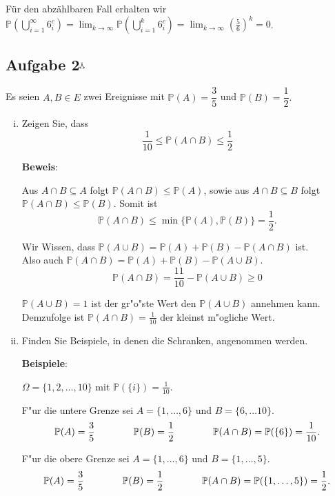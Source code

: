 \documentclass[11pt,a4paper,ngerman]{article}
\newcommand{\set}[1]{ \{ #1 \}}
\newcommand{\Prob}{\mathbb{P}}
\newcommand{\maxw}{$^\curlywedgedownarrow$}
\begin{document}
Für den abzählbaren Fall erhalten wir \\
$\Prob(\bigcup_{i=1}^\infty 6_i^c) = \lim_{k\to \infty} \Prob(\bigcup_{i=1}^k 6_i^c)
= \lim_{k\to \infty} \left(\frac{5}{6}\right)^k = 0$.

\subsection*{Aufgabe 2\maxw} 
Es seien $A, B \in E$ zwei Ereignisse mit $\Prob(A) = \dfrac{3}{5}$ und
$\Prob(B) = \dfrac{1}{2}.$

\begin{enumerate}[(i)]
  \item Zeigen Sie, dass \[
      \dfrac{1}{10} \le \Prob(A \cap B) \le \dfrac{1}{2}
    \]

    \textbf{Beweis}:

    Aus $A \cap B \subseteq A$ folgt $\Prob(A \cap B) \le \Prob(A)$, sowie aus
    $A \cap B \subseteq B$ folgt $\Prob(A \cap B) \le \Prob(B)$. Somit ist \[
      \Prob(A \cap B) \le \min\set{\Prob(A), \Prob(B)} = \dfrac{1}{2}.
    \]

    Wir Wissen, dass $\Prob(A\cup B) = \Prob(A) + \Prob(B) - \Prob(A\cap B)$ ist.\\
    Also auch $\Prob(A\cap B) = \Prob(A) + \Prob(B) - \Prob(A\cup B)$.
    \[
      \Prob(A\cap B) = \dfrac{11}{10} - \Prob(A\cup B) \ge 0
    \]

    $\Prob(A\cup B) = 1$ ist der gr"o"ste Wert den $\Prob(A\cup B)$ annehmen
    kann. Demzufolge ist $\Prob(A\cap B) = \frac{1}{10}$ der kleinst m"ogliche
    Wert.

  \item Finden Sie Beispiele, in denen die Schranken, angenommen werden.

    \textbf{Beispiele}:

    $\Omega = \set{1,2,\ldots,10}$ mit $\Prob(\set i) = \frac{1}{10}$.

    F"ur die untere Grenze sei $A = \set{1,\ldots,6}$ und
    $B = \set{6, \ldots 10}$. \[
      \Prob(A) = \dfrac{3}{5} \\ \qquad\qquad
      \Prob(B) = \dfrac{1}{2} \\ \qquad\qquad
      \Prob(A\cap B) = \Prob(\set 6) = \dfrac{1}{10}.
    \]

    F"ur die obere Grenze sei $A = \set{1,\ldots,6}$ und
    $B = \set{1,\ldots, 5}$. \[
      \Prob(A) = \dfrac{3}{5} \\ \qquad\qquad
      \Prob(B) = \dfrac{1}{2} \\ \qquad\qquad
      \Prob(A\cap B) = \Prob(\set{1,\ldots,5}) = \dfrac{1}{2}.
    \]


\end{enumerate}
\end{document}
